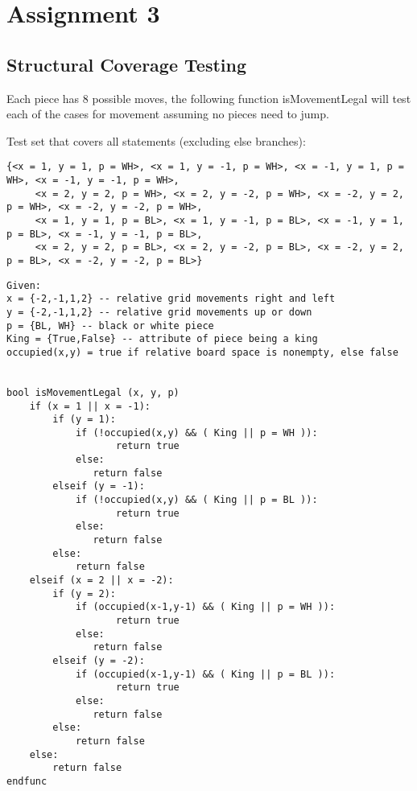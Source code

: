 \documentclass{article}
\begin{document}
\newpage

\section{Assignment 3}

\subsection{Structural Coverage Testing}
Each piece has 8 possible moves, the following function isMovementLegal will test each of the cases for movement assuming no pieces need to jump.

Test set that covers all statements (excluding else branches):
    \begin{lstlisting}[numbers=none,basicstyle=\tiny,frame=none]
     {<x = 1, y = 1, p = WH>, <x = 1, y = -1, p = WH>, <x = -1, y = 1, p = WH>, <x = -1, y = -1, p = WH>, 
     <x = 2, y = 2, p = WH>, <x = 2, y = -2, p = WH>, <x = -2, y = 2, p = WH>, <x = -2, y = -2, p = WH>,
     <x = 1, y = 1, p = BL>, <x = 1, y = -1, p = BL>, <x = -1, y = 1, p = BL>, <x = -1, y = -1, p = BL>,
     <x = 2, y = 2, p = BL>, <x = 2, y = -2, p = BL>, <x = -2, y = 2, p = BL>, <x = -2, y = -2, p = BL>}
    \end{lstlisting}
 
\begin{lstlisting}[style=CustomCSharpStyle,numbers=none]
Given:
x = {-2,-1,1,2} -- relative grid movements right and left
y = {-2,-1,1,2} -- relative grid movements up or down
p = {BL, WH} -- black or white piece
King = {True,False} -- attribute of piece being a king
occupied(x,y) = true if relative board space is nonempty, else false


bool isMovementLegal (x, y, p)
    if (x = 1 || x = -1):
        if (y = 1): 
            if (!occupied(x,y) && ( King || p = WH )):
                   return true
            else:
               return false
        elseif (y = -1):
            if (!occupied(x,y) && ( King || p = BL )):
                   return true
            else:
               return false
        else:
            return false
    elseif (x = 2 || x = -2):
        if (y = 2): 
            if (occupied(x-1,y-1) && ( King || p = WH )):
                   return true
            else:
               return false
        elseif (y = -2):
            if (occupied(x-1,y-1) && ( King || p = BL )):
                   return true
            else:
               return false
        else:
            return false
    else:
        return false
endfunc

\end{lstlisting}
\end{document}
